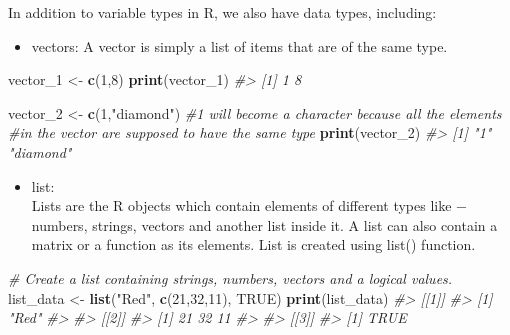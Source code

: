\documentclass[
]{book}
\newenvironment{Shaded}{\begin{snugshade}}{\end{snugshade}}
\newcommand{\CommentTok}[1]{\textcolor[rgb]{0.56,0.35,0.01}{\textit{#1}}}
\newcommand{\ConstantTok}[1]{\textcolor[rgb]{0.56,0.35,0.01}{#1}}
\newcommand{\DecValTok}[1]{\textcolor[rgb]{0.00,0.00,0.81}{#1}}
\newcommand{\FunctionTok}[1]{\textcolor[rgb]{0.13,0.29,0.53}{\textbf{#1}}}
\newcommand{\NormalTok}[1]{#1}
\newcommand{\OtherTok}[1]{\textcolor[rgb]{0.56,0.35,0.01}{#1}}
\newcommand{\StringTok}[1]{\textcolor[rgb]{0.31,0.60,0.02}{#1}}
\providecommand{\tightlist}{%
  \setlength{\itemsep}{0pt}\setlength{\parskip}{0pt}}
\begin{document}
In addition to variable types in R, we also have data types, including:

\begin{itemize}
\tightlist
\item
  vectors: A vector is simply a list of items that are of the same type.
\end{itemize}

\begin{Shaded}
\begin{Highlighting}[]
\NormalTok{vector\_1 }\OtherTok{\textless{}{-}} \FunctionTok{c}\NormalTok{(}\DecValTok{1}\NormalTok{,}\DecValTok{8}\NormalTok{)}
\FunctionTok{print}\NormalTok{(vector\_1)}
\CommentTok{\#\textgreater{} [1] 1 8}
\end{Highlighting}
\end{Shaded}

\begin{Shaded}
\begin{Highlighting}[]
\NormalTok{vector\_2 }\OtherTok{\textless{}{-}} \FunctionTok{c}\NormalTok{(}\DecValTok{1}\NormalTok{,}\StringTok{"diamond"}\NormalTok{) }\CommentTok{\#1 will become a character because all the elements }
                           \CommentTok{\#in the vector are supposed to have the same type}
\FunctionTok{print}\NormalTok{(vector\_2)}
\CommentTok{\#\textgreater{} [1] "1"       "diamond"}
\end{Highlighting}
\end{Shaded}

\begin{itemize}
\tightlist
\item
  list:\\
  Lists are the R objects which contain elements of different types like − numbers, strings, vectors and another list inside it. A list can also contain a matrix or a function as its elements. List is created using list() function.
\end{itemize}

\begin{Shaded}
\begin{Highlighting}[]
\CommentTok{\# Create a list containing strings, numbers, vectors and a logical values.}
\NormalTok{list\_data }\OtherTok{\textless{}{-}} \FunctionTok{list}\NormalTok{(}\StringTok{"Red"}\NormalTok{, }\FunctionTok{c}\NormalTok{(}\DecValTok{21}\NormalTok{,}\DecValTok{32}\NormalTok{,}\DecValTok{11}\NormalTok{), }\ConstantTok{TRUE}\NormalTok{)}
\FunctionTok{print}\NormalTok{(list\_data)}
\CommentTok{\#\textgreater{} [[1]]}
\CommentTok{\#\textgreater{} [1] "Red"}
\CommentTok{\#\textgreater{} }
\CommentTok{\#\textgreater{} [[2]]}
\CommentTok{\#\textgreater{} [1] 21 32 11}
\CommentTok{\#\textgreater{} }
\CommentTok{\#\textgreater{} [[3]]}
\CommentTok{\#\textgreater{} [1] TRUE}
\end{Highlighting}
\end{Shaded}
\end{document}

